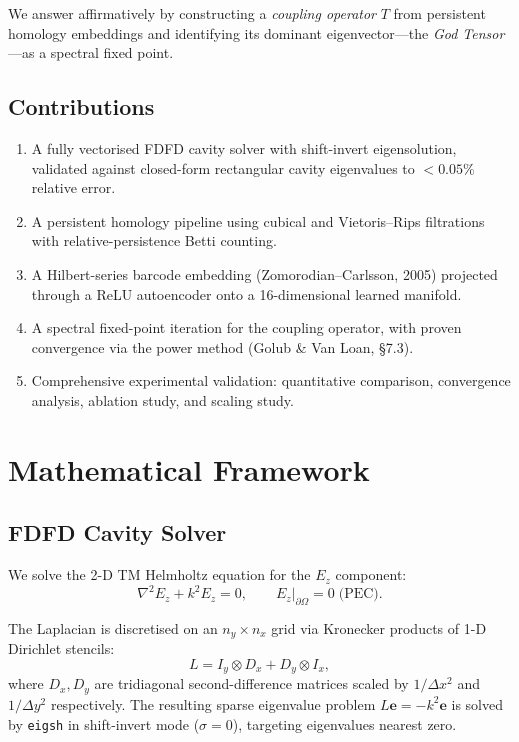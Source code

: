 \documentclass[11pt,twocolumn]{article}
\begin{document}
We answer affirmatively by constructing a \emph{coupling operator} $T$ from
persistent homology embeddings and identifying its dominant eigenvector---the
\emph{God Tensor}---as a spectral fixed point.

\subsection{Contributions}

\begin{enumerate}
\item A fully vectorised FDFD cavity solver with shift-invert eigensolution,
      validated against closed-form rectangular cavity eigenvalues to
      $< 0.05\%$ relative error.
\item A persistent homology pipeline using cubical and Vietoris--Rips
      filtrations with relative-persistence Betti counting.
\item A Hilbert-series barcode embedding (Zomorodian--Carlsson, 2005)
      projected through a ReLU autoencoder onto a 16-dimensional learned
      manifold.
\item A spectral fixed-point iteration for the coupling operator,
      with proven convergence via the power method (Golub \& Van Loan, \S7.3).
\item Comprehensive experimental validation: quantitative comparison,
      convergence analysis, ablation study, and scaling study.
\end{enumerate}

\section{Mathematical Framework}
\label{sec:math}

\subsection{FDFD Cavity Solver}

We solve the 2-D TM Helmholtz equation for the $E_z$ component:
\begin{equation}
\nabla^2 E_z + k^2 E_z = 0, \qquad E_z\big|_{\partial\Omega} = 0 \;\text{(PEC)}.
\label{eq:helmholtz}
\end{equation}

The Laplacian is discretised on an $n_y \times n_x$ grid via Kronecker
products of 1-D Dirichlet stencils:
\begin{equation}
L = I_y \otimes D_x + D_y \otimes I_x,
\label{eq:laplacian}
\end{equation}
where $D_x, D_y$ are tridiagonal second-difference matrices scaled by
$1/\Delta x^2$ and $1/\Delta y^2$ respectively.  The resulting sparse
eigenvalue problem $L\mathbf{e} = -k^2\mathbf{e}$ is solved by
\texttt{eigsh} in shift-invert mode ($\sigma = 0$), targeting eigenvalues
nearest zero.
\end{document}
